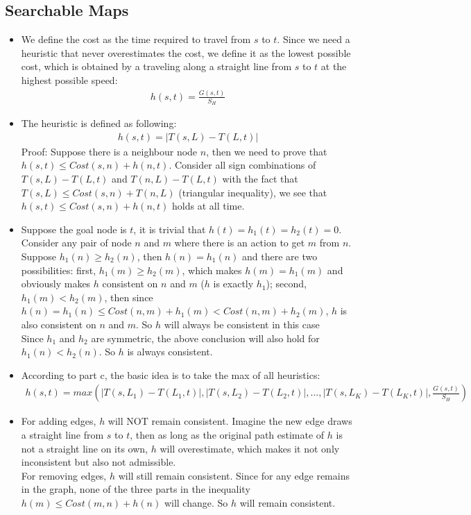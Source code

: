 \documentclass[11pt]{article}
\begin{document}
\begin{onehalfspace}
    \section{Searchable Maps}
    \begin{itemize}
        \item
        We define the cost as the time required to travel from $s$ to $t$. Since we need a heuristic that never overestimates the cost, we define it as the lowest possible cost, which is obtained by a traveling along a straight line from $s$ to $t$ at the highest possible speed: \\
        \begin{eqnarray*}
            h(s, t) = \frac{G(s, t)}{S_H}
        \end{eqnarray*}
        \item
        The heuristic is defined as following:
        \begin{eqnarray*}
            h(s, t) = |T(s, L) - T(L, t)|
        \end{eqnarray*}
        Proof: Suppose there is a neighbour node $n$, then we need to prove that $h(s, t) \leq Cost(s, n) + h(n, t)$. Consider all sign combinations of $T(s, L) - T(L, t)$ and $T(n, L) - T(L, t)$ with the fact that $T(s, L) \leq Cost(s, n) + T(n, L)$ (triangular inequality), we see that $h(s, t) \leq Cost(s, n) + h(n, t)$ holds at all time.
        \item
        Suppose the goal node is $t$, it is trivial that $h(t) = h_1(t) = h_2(t) = 0$.
        Consider any pair of node $n$ and $m$ where there is an action to get $m$ from $n$. Suppose $h_1(n) \geq h_2(n)$, then $h(n) = h_1(n)$ and there are two possibilities: first, $h_1(m) \geq h_2(m)$, which makes $h(m) = h_1(m)$ and obviously makes $h$ consistent on $n$ and $m$ ($h$ is exactly $h_1$); second, $h_1(m) < h_2(m)$, then since $h(n) = h_1(n) \leq Cost(n,m) + h_1(m) < Cost(n,m) + h_2(m)$, $h$ is also consistent on $n$ and $m$. So $h$ will always be consistent in this case\\
        Since $h_1$ and $h_2$ are symmetric, the above conclusion will also hold for $h_1(n) < h_2(n)$. So $h$ is always consistent.
        \item According to part c, the basic idea is to take the max of all heuristics:
        \begin{eqnarray*}
            h(s, t) = max(|T(s, L_1) - T(L_1, t)|, |T(s, L_2) - T(L_2, t)|, ... , |T(s, L_K) - T(L_K, t)|, \frac{G(s, t)}{S_H})
        \end{eqnarray*}
        \item
        For adding edges, $h$ will NOT remain consistent. Imagine the new edge draws a straight line from $s$ to $t$, then as long as the original path estimate of $h$ is not a straight line on its own, $h$ will overestimate, which makes it not only inconsistent but also not admissible. \\
        For removing edges, $h$ will still remain consistent. Since for any edge remains in the graph, none of the three parts in the inequality $h(m) \leq Cost(m, n) + h(n)$ will change. So $h$ will remain consistent.
    \end{itemize}
    \newpage{}

\end{onehalfspace}
\end{document}
